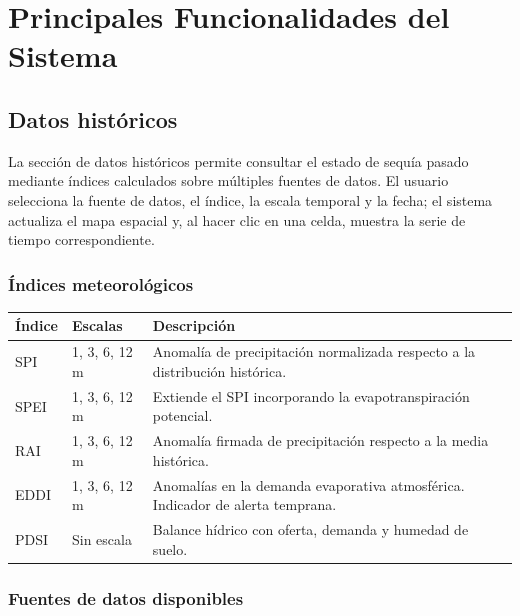 \chapter{Principales Funcionalidades del Sistema}
\label{ch:funcionalidades}

\section{Datos históricos}
\label{sec:datos_historicos}

La sección de datos históricos permite consultar el estado de sequía pasado mediante índices calculados sobre múltiples fuentes de datos. El usuario selecciona la fuente de datos, el índice, la escala temporal y la fecha; el sistema actualiza el mapa espacial y, al hacer clic en una celda, muestra la serie de tiempo correspondiente.

\subsection*{Índices meteorológicos}

\begin{center}
\small
\begin{tabular}{@{}lll@{}}
\toprule
\textbf{Índice} & \textbf{Escalas} & \textbf{Descripción} \\
\midrule
SPI  & 1, 3, 6, 12 m & Anomalía de precipitación normalizada respecto a la distribución histórica. \\
SPEI & 1, 3, 6, 12 m & Extiende el SPI incorporando la evapotranspiración potencial. \\
RAI  & 1, 3, 6, 12 m & Anomalía firmada de precipitación respecto a la media histórica. \\
EDDI & 1, 3, 6, 12 m & Anomalías en la demanda evaporativa atmosférica. Indicador de alerta temprana. \\
PDSI & Sin escala    & Balance hídrico con oferta, demanda y humedad de suelo. \\
\bottomrule
\end{tabular}
\end{center}

\subsection*{Fuentes de datos disponibles}

